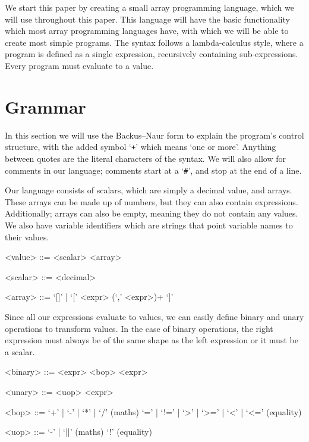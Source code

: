 \documentclass[../main.tex]{subfiles}
\newcommand{\grammarcomment}[1]{\hfill(#1)}
\begin{document}
We start this paper by creating a small array programming language, which we will use throughout this paper. This language will have the basic functionality which most array programming languages have, with which we will be able to create most simple programs.
The syntax follows a lambda-calculus style, where a program is defined as a single expression, recursively containing sub-expressions. Every program must evaluate to a value.

\section{Grammar}
In this section we will use the Backus–Naur form\cite{backus} to explain the program's control structure, with the added symbol `\texttt{+}' which means `one or more'. Anything between quotes are the literal characters of the syntax.
We will also allow for comments in our language; comments start at a `\texttt{\#}', and stop at the end of a line.

Our language consists of scalars, which are simply a decimal value, and arrays. These arrays can be made up of numbers, but they can also contain expressions. Additionally; arrays can also be empty, meaning they do not contain any values. We also have variable identifiers which are strings that point variable names to their values.
\begin{grammar}
<value> ::= <scalar>
     \alt <array>

<scalar> ::= <decimal>

<array> ::= `[]' | `[' <expr> (`,' <expr>)+ `]'
\end{grammar}

Since all our expressions evaluate to values, we can easily define binary and unary operations to transform values. In the case of binary operations, the right expression must always be of the same shape as the left expression or it must be a scalar.
\begin{grammar}
<binary> ::= <expr> <bop> <expr>

<unary> ::= <uop> <expr>

<bop> ::= `+' | `-' | `*' | `/'                 \grammarcomment{maths}
    \alt `=' | `!=' | `>' | `>=' | `<' | `<='   \grammarcomment{equality}

<uop> ::= `-' | `||'    \grammarcomment{maths}
    \alt `!'            \grammarcomment{equality}
\end{grammar}
\end{document}
